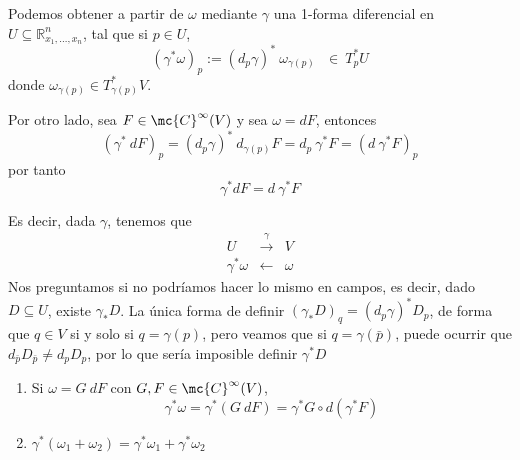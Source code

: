\begin{obs}
    Podemos obtener a partir de $\omega$ mediante $\gamma$ una 1-forma diferencial en $U \subseteq \mathbb R^n_{x_1, \ldots, x_n}$, tal que si $p \in U$,
    $$\boxed{(\gamma^* \omega)_p:=(d_p \gamma)^* \: \omega_{\gamma(p)}} \: \: \:\in \: T_p^*U$$
    donde $\omega_{\gamma(p)} \in T_{\gamma(p)}^*V$.

    Por otro lado, sea $F \in \mc{C}^{\infty}(V)$ y sea $\omega=dF$, entonces
    $$(\gamma^* \: dF)_p = (d_p\gamma)^* \: d_{\gamma(p)}F=d_p \: \gamma^*F=(d\: \gamma^* F)_p$$
    por tanto
    $$\boxed{\gamma^*dF=d \: \gamma^* F}$$
\end{obs}
\begin{obs}
    Es decir, dada $\gamma$, tenemos que 
    $$\begin{array}{rcl}
         U & \overset{\gamma}{\longrightarrow} & V  \\
         \gamma^*\omega & \longleftarrow & \omega 
    \end{array}$$
    Nos preguntamos si no podríamos hacer lo mismo en campos, es decir, dado $D \subseteq U$, existe $\gamma_*D$. La única forma de definir $(\gamma_*D)_q=(d_p\gamma)^* D_p$, de forma que $q \in V$ si y solo si $q=\gamma(p)$, pero veamos que si $q = \gamma(\bar{p})$, puede ocurrir que $d_{\bar{p}}D_{\bar{p}}\neq d_{{p}}D_{{p}}$, por lo que sería imposible definir $\gamma^* D$
\end{obs}
\begin{propi} \:
    \begin{enumerate}
        \item Si $\omega = G \: dF$ con $G,F \in \mc{C}^{\infty}(V)$,
        $$\gamma^* \omega = \gamma^*(G \: dF)=\gamma^*G \circ d(\gamma^*F)$$
        \item $\gamma^*(\omega_1+\omega_2)=\gamma^* \omega_1 + \gamma^* \omega_2$
    \end{enumerate}
\end{propi}

